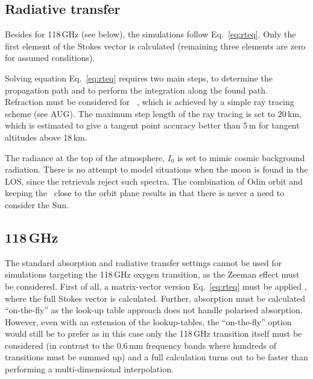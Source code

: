 \subsection{Radiative transfer}
%
Besides for 118\,GHz (see below), the simulations follow Eq.~\ref{eq:rteq}. Only
the first element of the Stokes vector is calculated (remaining three elements
are zero for assumed conditions).

Solving equation Eq.~\ref{eq:rteq} requires two main steps, to determine the
propagation path and to perform the integration along the found path.
Refraction must be considered for \smr\ \citep{eriksson:studi:02}, which is
achieved by a simple ray tracing scheme (see AUG). The maximum step length of
the ray tracing is set to 20\,km, which is estimated to give a
tangent point accuracy better than 5\,m for tangent altitudes
above 18\,km.

The radiance at the top of the atmosphere, $I_0$ is set to mimic cosmic
background radiation. There is no attempt to model situations when the moon is
found in the LOS, since the retrievals reject such spectra. The combination of Odin
orbit and keeping the \LOS\ close to the orbit plane results in that there is
never a need to consider the Sun.



\subsection{118\,GHz}
%
The standard absorption and radiative transfer settings cannot be used for
simulations targeting the 118\,GHz oxygen transition, as the Zeeman effect must
be considered. First of all, a matrix-vector version Eq.~\ref{eq:rteq} must be
applied \citep{larsson:zeema:14}, where the full Stokes vector is calculated.
Further, absorption must be calculated ``on-the-fly'' as the look-up table
approach does not handle polarised absorption. However, even with an extension
of the lookup-tables, the ``on-the-fly'' option would still be to prefer as in
this case only the 118\,GHz transition itself must be considered (in contrast
to the 0.6\,mm frequency bands where hundreds of transitions must be summed
up) and a full calculation turns out to be faster than performing a
multi-dimensional interpolation.



